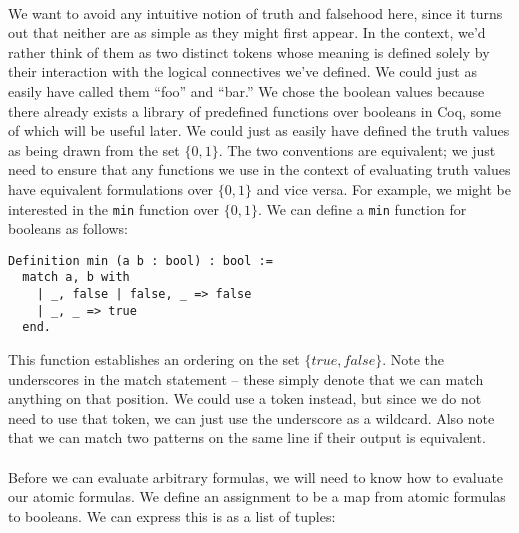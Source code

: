 \documentclass{article}
\begin{document}
\paragraph{}
We want to avoid any intuitive notion of truth and falsehood here, since it turns out that neither are as simple as they might first appear. In the context, we'd rather think of them as two distinct tokens whose meaning is defined solely by their interaction with the logical connectives we've defined. We could just as easily have called them ``foo'' and ``bar.'' We chose the boolean values because there already exists a library of predefined functions over booleans in Coq, some of which will be useful later. We could just as easily have defined the truth values as being drawn from the set $\lbrace 0, 1\rbrace$. The two conventions are equivalent; we just need to ensure that any functions we use in the context of evaluating truth values have equivalent formulations over $\lbrace 0, 1\rbrace$ and vice versa. For example, we might be interested in the \verb|min| function over $\lbrace 0, 1 \rbrace$. We can define a \verb|min| function for booleans as follows:
\begin{lstlisting}
Definition min (a b : bool) : bool :=                                                                                                                                                         
  match a, b with                                                                                                                                                                                           
    | _, false | false, _ => false                                                                                                                                                           
    | _, _ => true                                                                                                                                                                                     
  end.
\end{lstlisting}
This function establishes an ordering on the set $\lbrace true, false \rbrace$. Note the underscores in the match statement -- these simply denote that we can match anything on that position. We could use a token instead, but since we do not need to use that token, we can just use the underscore as a wildcard. Also note that we can match two patterns on the same line if their output is equivalent.
\paragraph{}
Before we can evaluate arbitrary formulas, we will need to know how to evaluate our atomic formulas. We define an assignment to be a map from atomic formulas to booleans. We can express this is as a list of tuples:
\end{document}
